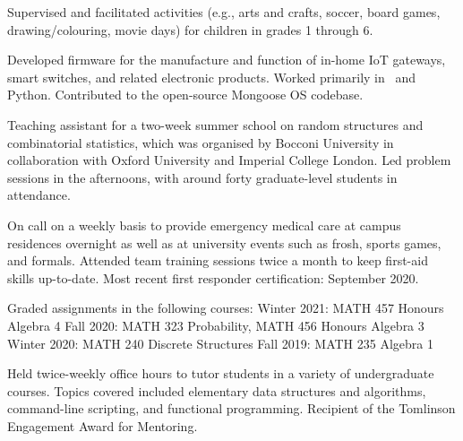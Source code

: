 \smallskip
Supervised and facilitated activities (e.g., arts and crafts, soccer, board games, drawing/colouring, movie
days) for children in grades 1 through 6.
\medbreak

\smallskip
Developed firmware for the manufacture and function of in-home IoT gateways, smart switches,
and related electronic products. Worked primarily in \CEE\ and Python. Contributed to the open-source
Mongoose OS codebase.
\medbreak

\smallskip
Teaching assistant for a two-week summer school on random structures and combinatorial statistics,
which was
organised by Bocconi University in collaboration with Oxford University
and Imperial College London. Led problem sessions in the afternoons, with
around forty graduate-level students in attendance.
\medbreak

\smallskip
On call on a weekly basis to provide emergency medical care at campus residences overnight as well as at
university events such as frosh, sports games, and formals. Attended team training sessions twice a month to keep
first-aid skills up-to-date. Most recent first responder certification: September 2020.
\medbreak

\smallskip
Graded assignments in the following courses:
\begingroup\parindent=10pt
\smallskip
\thing Winter 2021: MATH 457 Honours Algebra 4
\smallskip
\thing Fall 2020: MATH 323 Probability, MATH 456 Honours Algebra 3
\smallskip
\thing Winter 2020: MATH 240 Discrete Structures
\smallskip
\thing Fall 2019: MATH 235 Algebra 1
\endgroup
\medbreak

\smallskip
Held twice-weekly office hours to tutor students in a variety of undergraduate courses.
Topics covered included elementary data structures and algorithms, command-line scripting,
and functional programming. Recipient of the Tomlinson Engagement Award for Mentoring.
\medbreak

